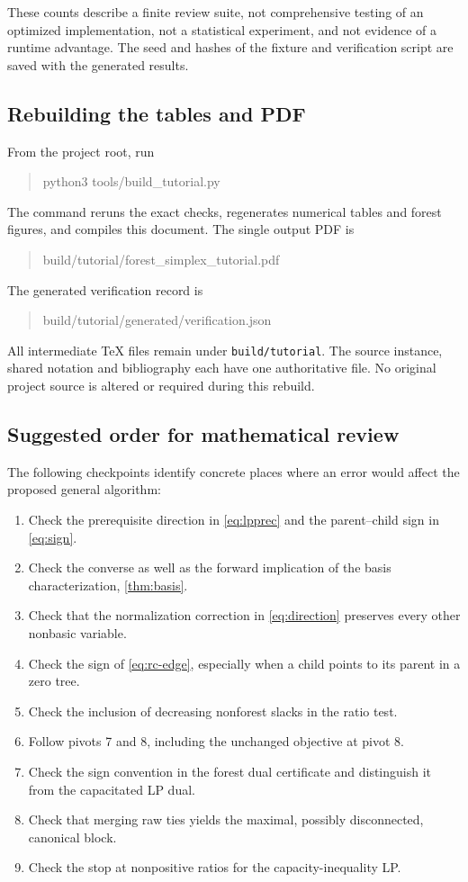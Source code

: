 These counts describe a finite review suite, not comprehensive testing of
an optimized implementation, not a statistical experiment, and not evidence
of a runtime advantage. The seed and hashes of the fixture and verification
script are saved with the generated results.

\subsection{Rebuilding the tables and PDF}
From the project root, run
\begin{quote}\ttfamily
python3 tools/build\_tutorial.py
\end{quote}
The command reruns the exact checks, regenerates numerical tables and forest
figures, and compiles this document. The single output PDF is
\begin{quote}\ttfamily\small
build/tutorial/forest\_simplex\_tutorial.pdf
\end{quote}
The generated verification record is
\begin{quote}\ttfamily\small
build/tutorial/generated/verification.json
\end{quote}
All intermediate TeX files remain under \texttt{build/tutorial}. The source
instance, shared notation and bibliography each have one authoritative file.
No original project source is altered or required during this rebuild.

\subsection{Suggested order for mathematical review}
The following checkpoints identify concrete places where an error would
affect the proposed general algorithm:
\begin{enumerate}
\item Check the prerequisite direction in \eqref{eq:lpprec} and the
parent--child sign in \eqref{eq:sign}.
\item Check the converse as well as the forward implication of the basis
characterization, \cref{thm:basis}.
\item Check that the normalization correction in \eqref{eq:direction}
preserves every other nonbasic variable.
\item Check the sign of \eqref{eq:rc-edge}, especially when a child points
to its parent in a zero tree.
\item Check the inclusion of decreasing nonforest slacks in the ratio test.
\item Follow pivots 7 and 8, including the unchanged objective at pivot 8.
\item Check the sign convention in the forest dual certificate and distinguish
it from the capacitated LP dual.
\item Check that merging raw ties yields the maximal, possibly disconnected,
canonical block.
\item Check the stop at nonpositive ratios for the capacity-inequality LP.
\end{enumerate}

